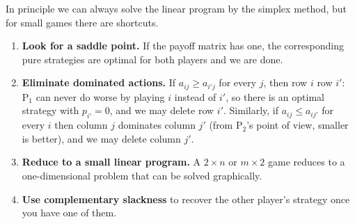 \documentclass[a4paper]{scrartcl}
\begin{document}
In principle we can always solve the linear program by the simplex method, but for small games there are shortcuts.
\begin{enumerate}[label=(\arabic*)]
    \item \textbf{Look for a saddle point.} If the payoff matrix has one, the corresponding pure strategies are optimal for both players and we are done.
    \item \textbf{Eliminate dominated actions.} If $a_{ij} \geq a_{i'j}$ for every $j$, then row $i$  row $i'$: $\mathrm{P}_1$ can never do worse by playing $i$ instead of $i'$, so there is an optimal strategy with $p_{i'} = 0$, and we may delete row $i'$. Similarly, if $a_{ij} \leq a_{ij'}$ for every $i$ then column $j$ dominates column $j'$ (from $\mathrm{P}_2$'s point of view, smaller is better), and we may delete column $j'$.
    \item \textbf{Reduce to a small linear program.} A $2 \times n$ or $m\times 2$ game reduces to a one-dimensional problem that can be solved graphically.
    \item \textbf{Use complementary slackness} to recover the other player's strategy once you have one of them.
\end{enumerate}
\end{document}
